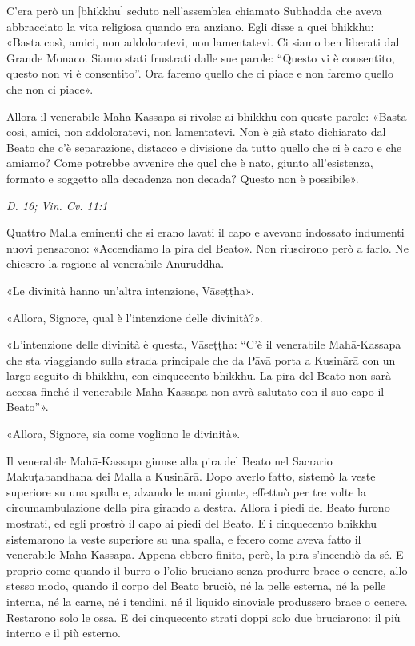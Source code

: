 C’era però un [bhikkhu] seduto nell’assemblea chiamato Subhadda che
aveva abbracciato la vita religiosa quando era anziano. Egli disse a
quei bhikkhu: «Basta così, amici, non addoloratevi, non lamentatevi. Ci
siamo ben liberati dal Grande Monaco. Siamo stati frustrati dalle sue
parole: “Questo vi è consentito, questo non vi è consentito”. Ora faremo
quello che ci piace e non faremo quello che non ci piace».


Allora il venerabile Mahā-Kassapa si rivolse ai bhikkhu con queste
parole: «Basta così, amici, non addoloratevi, non lamentatevi. Non è già
stato dichiarato dal Beato che c’è separazione, distacco e divisione da
tutto quello che ci è caro e che amiamo? Come potrebbe avvenire che quel
che è nato, giunto all’esistenza, formato e soggetto alla decadenza non
decada? Questo non è possibile».


\emph{D. 16; Vin. Cv. 11:1}


Quattro Malla eminenti che si erano lavati il capo e avevano indossato
indumenti nuovi pensarono: «Accendiamo la pira del Beato». Non
riuscirono però a farlo. Ne chiesero la ragione al venerabile Anuruddha.


«Le divinità hanno un’altra intenzione, Vāseṭṭha».


«Allora, Signore, qual è l’intenzione delle divinità?».


«L’intenzione delle divinità è questa, Vāseṭṭha: “C’è il venerabile
Mahā-Kassapa che sta viaggiando sulla strada principale che da Pāvā
porta a Kusinārā con un largo seguito di bhikkhu, con cinquecento
bhikkhu. La pira del Beato non sarà accesa finché il venerabile
Mahā-Kassapa non avrà salutato con il suo capo il Beato”».


«Allora, Signore, sia come vogliono le divinità».


Il venerabile Mahā-Kassapa giunse alla pira del Beato nel Sacrario
Makuṭabandhana dei Malla a Kusinārā. Dopo averlo fatto, sistemò la veste
superiore su una spalla e, alzando le mani giunte, effettuò per tre
volte la circumambulazione della pira girando a destra. Allora i piedi
del Beato furono mostrati, ed egli prostrò il capo ai piedi del Beato. E
i cinquecento bhikkhu sistemarono la veste superiore su una spalla, e
fecero come aveva fatto il venerabile Mahā-Kassapa. Appena ebbero
finito, però, la pira s’incendiò da sé. E proprio come quando il burro o
l’olio bruciano senza produrre brace o cenere, allo stesso modo, quando
il corpo del Beato bruciò, né la pelle esterna, né la pelle interna, né
la carne, né i tendini, né il liquido sinoviale produssero brace o
cenere. Restarono solo le ossa. E dei cinquecento strati doppi solo due
bruciarono: il più interno e il più esterno.


